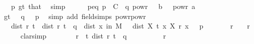 \begin{isabellebody}
\ {\isacartoucheopen}{}\ {\isacharless}{\kern0pt}\ p{\isacartoucheclose}\ gt{\isacharunderscore}{\kern0pt}{}{\isacharparenleft}{\kern0pt}{}{\isacharparenright}{\kern0pt}\ that{\isacharparenleft}{\kern0pt}{}{\isacharparenright}{\kern0pt}\ \isamarkupfalse%
\ simp\isanewline
\ \ \ \ \isamarkupfalse%
\ p{\isacharunderscore}{\kern0pt}eq{\isacharcolon}{\kern0pt}\ {\isachardoublequoteopen}p\ {\isacharequal}{\kern0pt}\ {\isacharparenleft}{\kern0pt}C\ {\isacharasterisk}{\kern0pt}\ {\isacharquery}{\kern0pt}q\ powr\ {\isacharparenleft}{\kern0pt}{}\ {\isacharplus}{\kern0pt}\ b{\isacharparenright}{\kern0pt}{\isacharparenright}{\kern0pt}\ {\isacharslash}{\kern0pt}\ {\isasymepsilon}\ powr\ a{\isachardoublequoteclose}\isanewline
\ \ \ \ \ \ \isamarkupfalse%
\ gt{\isacharunderscore}{\kern0pt}{}\ {\isacartoucheopen}{}\ {\isacharless}{\kern0pt}\ {\isacharquery}{\kern0pt}q{\isacartoucheclose}\ {\isacartoucheopen}{}\ {\isacharless}{\kern0pt}\ p{\isacartoucheclose}\ \isamarkupfalse%
\ {\isacharparenleft}{\kern0pt}simp\ add{\isacharcolon}{\kern0pt}\ field{\isacharunderscore}{\kern0pt}simps\ powr{\isacharunderscore}{\kern0pt}powr{\isacharparenright}{\kern0pt}\isanewline
\ \ \ \ \isamarkupfalse%
\ {\isachardoublequoteopen}{}\ {\isacharless}{\kern0pt}\ dist\ r\ t\ {\isasymand}\ dist\ r\ t\ {\isacharless}{\kern0pt}\ {\isacharquery}{\kern0pt}q\ {\isasymlongrightarrow}\ dist\ {\isasymP}{\isacharparenleft}{\kern0pt}x\ in\ {\isacharquery}{\kern0pt}M{\isachardot}{\kern0pt}\ {\isasymepsilon}\ {\isasymle}\ dist\ {\isacharparenleft}{\kern0pt}X\ t\ x{\isacharparenright}{\kern0pt}\ {\isacharparenleft}{\kern0pt}X\ r\ x{\isacharparenright}{\kern0pt}{\isacharparenright}{\kern0pt}\ {}\ {\isasymle}\ p{\isachardoublequoteclose}\isanewline
\ \ \ \ \ \ \ {\isachardoublequoteopen}r\ {\isasymin}\ {\isacharbraceleft}{\kern0pt}{}{\isachardot}{\kern0pt}{\isachardot}{\kern0pt}{\isacharbraceright}{\kern0pt}{\isachardoublequoteclose}\ \ r\isanewline
\ \ \ \ \isamarkupfalse%
\ {\isacharparenleft}{\kern0pt}clarsimp{\isacharparenright}{\kern0pt}\isanewline
\ \ \ \ \ \ \isamarkupfalse%
\ {\isachardoublequoteopen}r\ {\isasymnoteq}\ t{\isachardoublequoteclose}\ {\isachardoublequoteopen}dist\ r\ t\ {\isacharless}{\kern0pt}\ {\isacharquery}{\kern0pt}q{\isachardoublequoteclose}\isanewline
\ \ \ \ \ \ \isamarkupfalse%
\ {\isachardoublequoteopen}{}\ {\isasymle}\ r{\isachardoublequoteclose}\isanewline

\end{isabellebody}

